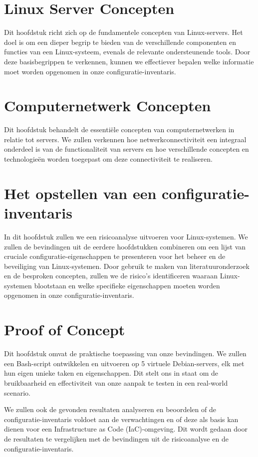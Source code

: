 \section{Linux Server Concepten}
\label{sec:linux-server-concepten}
Dit hoofdstuk richt zich op de fundamentele concepten van Linux-servers.
Het doel is om een dieper begrip te bieden van de verschillende componenten en functies van een Linux-systeem, evenals de relevante ondersteunende tools.
Door deze basisbegrippen te verkennen, kunnen we effectiever bepalen welke informatie moet worden opgenomen in onze configuratie-inventaris.

\section{Computernetwerk Concepten}
\label{sec:computernetwerk-concepten}
Dit hoofdstuk behandelt de essenti\"ele concepten van computernetwerken in relatie tot servers.
We zullen verkennen hoe netwerkconnectiviteit een integraal onderdeel is van de functionaliteit van servers en hoe verschillende concepten en technologie\"en worden toegepast om deze connectiviteit te realiseren.

\section{Het opstellen van een configuratie-inventaris}
\label{sec:risicoanalyse}
In dit hoofdstuk zullen we een risicoanalyse uitvoeren voor Linux-systemen.
We zullen de bevindingen uit de eerdere hoofdstukken combineren om een lijst van cruciale configuratie-eigenschappen te presenteren voor het beheer en de beveiliging van Linux-systemen.
Door gebruik te maken van literatuuronderzoek en de besproken concepten, zullen we de risico's identificeren waaraan Linux-systemen blootstaan en welke specifieke eigenschappen moeten worden opgenomen in onze configuratie-inventaris.

\section{Proof of Concept}
\label{sec:proof-of-concept}
Dit hoofdstuk omvat de praktische toepassing van onze bevindingen.
We zullen een Bash-script ontwikkelen en uitvoeren op 5 virtuele Debian-servers, elk met hun eigen unieke taken en eigenschappen.
Dit stelt ons in staat om de bruikbaarheid en effectiviteit van onze aanpak te testen in een real-world scenario.

We zullen ook de gevonden resultaten analyseren en beoordelen of de configuratie-inventaris voldoet aan de verwachtingen en of deze als basis kan dienen voor een Infrastructure as Code (IaC)-omgeving.
Dit wordt gedaan door de resultaten te vergelijken met de bevindingen uit de risicoanalyse en de configuratie-inventaris.
